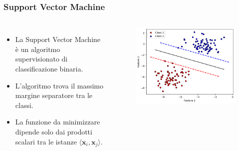 \documentclass{beamer}
\begin{document}
\begin{frame}

  \frametitle{Support Vector Machine}
  
    \begin{columns}
    
      \begin{itemize}
        \item<1-> La Support Vector Machine è un algoritmo supervisionato di classificazione binaria. 
            \item<2-> L'algoritmo trova il massimo margine separatore tra le classi. 
            \item<3-> La funzione da minimizzare dipende solo dai prodotti scalari tra le istanze $\langle \mathbf{x}_i, \mathbf{x}_j \rangle$. 
            \end{itemize}
      
      \begin{figure}
            \includegraphics[width=1.1\textwidth]{images/classicalsvm.png}
       \end{figure}
      
      \end{columns}
  
  \end{frame}
\end{document}
